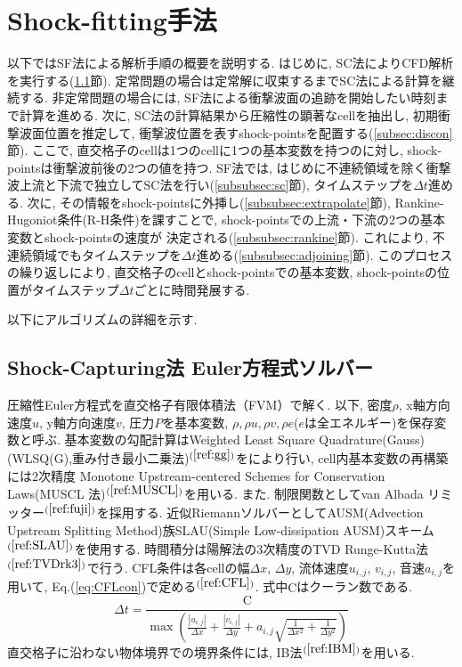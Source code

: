 \documentclass[a4j]{jarticle}
\begin{document}
\section{Shock-fitting手法} \label{sec:method}
以下ではSF法による解析手順の概要を説明する.
はじめに, SC法によりCFD解析を実行する(\ref{subsec:sc}節).
定常問題の場合は定常解に収束するまでSC法による計算を継続する.
非定常問題の場合には, SF法による衝撃波面の追跡を開始したい時刻まで計算を進める. 
次に, SC法の計算結果から圧縮性の顕著なcellを抽出し, 初期衝撃波面位置を推定して, 
衝撃波位置を表すshock-pointsを配置する(\ref{subsec:discon}節).
ここで, 直交格子のcellは1つのcellに1つの基本変数を持つのに対し, shock-pointsは衝撃波前後の2つの値を持つ.
SF法では, はじめに不連続領域を除く衝撃波上流と下流で独立してSC法を行い(\ref{subsubsec:sc}節), タイムステップを$\Delta t$進める.
次に, その情報をshock-pointsに外挿し(\ref{subsubsec:extrapolate}節), Rankine-Hugoniot条件(R-H条件)を課すことで, shock-pointsでの上流・下流の2つの基本変数とshock-pointsの速度が
決定される(\ref{subsubsec:rankine}節). これにより, 不連続領域でもタイムステップを$\Delta t$進める(\ref{subsubsec:adjoining}節). 
このプロセスの繰り返しにより, 直交格子のcellとshock-pointsでの基本変数, shock-pointsの位置がタイムステップ$\Delta t$ごとに時間発展する. 

以下にアルゴリズムの詳細を示す.

\subsection{Shock-Capturing法 Euler方程式ソルバー} \label{subsec:sc}

圧縮性Euler方程式を直交格子有限体積法（FVM）で解く.
以下, 密度$\rho$, x軸方向速度$u$, y軸方向速度$v$, 圧力$P$を基本変数,
$\rho, \rho u, \rho v, \rho e$($e$は全エネルギー)を保存変数と呼ぶ.
基本変数の勾配計算はWeighted Least Square Quadrature(Gauss)(WLSQ(G),重み付き最小二乗法)$^{(\ref{ref:gg})}$をにより行い, cell内基本変数の再構築には2次精度 Monotone Upstream-centered
Schemes for Conservation Laws(MUSCL 法)$^{(\ref{ref:MUSCL})}$を用いる. また. 制限関数としてvan Albada リミッター$^{(\ref{ref:fuji})}$を採用する.
近似RiemannソルバーとしてAUSM(Advection Upstream Splitting Method)族SLAU(Simple Low-dissipation AUSM)スキーム$^{(\ref{ref:SLAU})}$を使用する.
時間積分は陽解法の3次精度のTVD Runge-Kutta法$^{(\ref{ref:TVDrk3})}$で行う.
CFL条件は各cellの幅$\Delta x$, $\Delta y$, 流体速度$u_{i,j}$, $v_{i,j}$, 音速$a_{i, j}$を用いて, Eq.(\ref{eq:CFLcon})で定める$^{(\ref{ref:CFL})}$.
式中$\mathrm{C}$はクーラン数である.
\begin{equation}
    \Delta t =
    \frac{\mathrm{C}}{
        \max\left(
            \frac{|u_{i,j}|}{\Delta x}
            + \frac{|v_{i,j}|}{\Delta y}
            + a_{i,j}
              \sqrt{
                \frac{1}{\Delta x^2}
                + \frac{1}{\Delta y^2}
              }
        \right)
    }
    \label{eq:CFLcon}
\end{equation}
直交格子に沿わない物体境界での境界条件には, IB法$^{(\ref{ref:IBM})}$を用いる.
\end{document}
